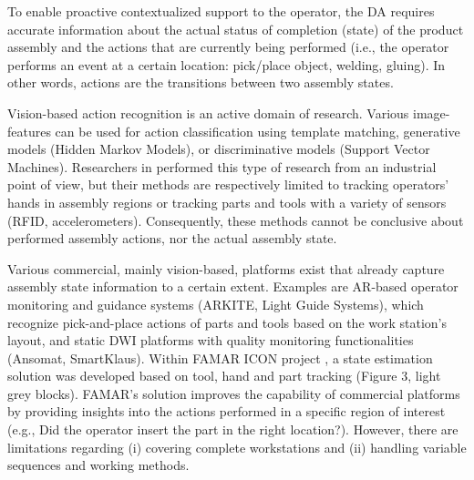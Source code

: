 To enable proactive contextualized support to the operator, the DA requires accurate information about the actual status of completion (state) of the product assembly and the actions that are currently being performed (i.e., the operator performs an event at a certain location: pick/place object, welding, gluing). In other words, actions are the transitions between two assembly states.
 
Vision-based action recognition \cite{beddiar2020VisionbasedHumanActivity, zhang2017ReviewHumanActivity} is an active domain of research. Various image-features can be used for action classification using template matching, generative models (Hidden Markov Models), or discriminative models (Support Vector Machines). Researchers in \cite{kaczmarek2015ProgressMonitoringGesture,karcher2018SensordrivenAnalysisManual} performed this type of research from an industrial point of view, but their methods are respectively limited to tracking operators' hands in assembly regions or tracking parts and tools with a variety of sensors (RFID, accelerometers). Consequently, these methods cannot be conclusive about performed assembly actions, nor the actual assembly state.

Various commercial, mainly vision-based, platforms exist that already capture assembly state information to a certain extent. Examples are AR-based operator monitoring and guidance systems (ARKITE, Light Guide Systems), which recognize pick-and-place actions of parts and tools based on the work station's layout, and static DWI platforms with quality monitoring functionalities (Ansomat, SmartKlaus). Within FAMAR ICON project \cite{zogopoulos2021ImagebasedStateTracking}, a state estimation solution was developed based on tool, hand and part tracking (Figure 3, light grey blocks). FAMAR's solution improves the capability of commercial platforms by providing insights into the actions performed in a specific region of interest (e.g., Did the operator insert the part in the right location?). However, there are limitations regarding (i) covering complete workstations and (ii) handling variable sequences and working methods. 
